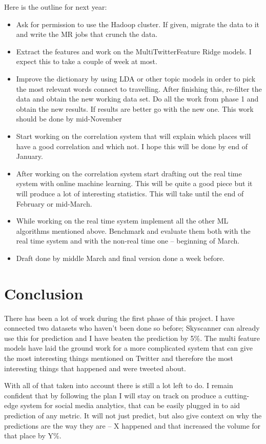 \documentclass[minf,twoside,singlespacing,parskip,frontabs,notimes,11pt]{infthesis}
\begin{document}
Here is the outline for next year:

\begin{itemize}
\item Ask for permission to use the Hadoop cluster. If given, migrate the data to it and write the MR jobs that crunch the data. 
\item Extract the features and work on the MultiTwitterFeature Ridge models. I expect this to take a couple of week at most. 
\item Improve the dictionary by using LDA or other topic models in order to pick the most relevant words connect to travelling. After finishing this, re-filter the data and obtain the new working data set. Do all the work from phase 1 and obtain the new results. If results are better go with the new one. This work should be done by mid-November
\item Start working on the correlation system that will explain which places will have a good correlation and which not. I hope this will be done by end of January. 
\item After working on the correlation system start drafting out the real time system with online machine learning. This will be quite a good piece but it will produce a lot of interesting statistics. This will take until the end of February or mid-March.
\item While working on the real time system implement all the other ML algorithms mentioned above. Benchmark and evaluate them both with the real time system and with the non-real time one -- beginning of March.
\item Draft done by middle March and final version done a week before. 
\end{itemize}



\section{Conclusion}


There has been a lot of work during the first phase of this project. I have connected two datasets who haven't been done so before; Skyscanner can already use this for prediction and I have beaten the prediction by 5\%. The multi feature models have laid the ground work for a more complicated system that can give the most interesting things mentioned on Twitter and therefore the most interesting things that happened and were tweeted about. 


With all of that taken into account there is still a lot left to do. I remain confident that by following the plan I will stay on track on produce a cutting-edge system for social media analytics, that can be easily plugged in to aid prediction of any metric. It will not just predict, but also give context on why the predictions are the way they are -- X happened and that increased the volume for that place by Y\%. 
\end{document}
